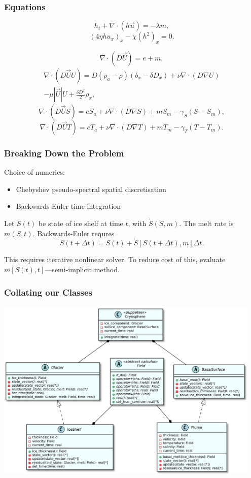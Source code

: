 \documentclass[12pt]{beamer}
\begin{document}
\begin{frame}
  \frametitle{Equations}
  $$ h_{t} + \nabla\cdot(h\vec{u}) = -\lambda m, $$
  $$ {\left(4\eta hu_x\right)}_{x} - \chi{\left(h^2\right)}_x = 0. $$
  
  $$ \nabla\cdot\left(D\vec{U}\right) = e + m, $$
  \begin{multline*}
    \nabla\cdot\left(D\vec{U}U\right) = D(\rho_a - \rho)\left(b_x -
      \delta D_x\right) + \nu\nabla\cdot\left(D\nabla U\right) \\
    - \mu|\vec{U}|U + \frac{\delta D^2}{2}\rho_x,
  \end{multline*}
  $$ \nabla\cdot\left(D\vec{U}S\right) = eS_a
  + \nu\nabla\cdot\left(D\nabla S\right) + mS_m - \gamma_S(S-S_m), $$
  $$ \nabla\cdot\left(D\vec{U}T\right) = eT_a
  + \nu\nabla\cdot\left(D\nabla T\right) + mT_m - \gamma_T(T-T_m). $$
\end{frame}

\begin{frame}
  \frametitle{Breaking Down the Problem}
  Choice of numerics:
  \begin{itemize}
  \item Chebyshev pseudo-spectral spatial discretisation
  \item Backwards-Euler time integration
  \end{itemize}
  
  \vspace{3mm}
  Let $S(t)$ be state of ice shelf at time $t$, with
  $\dot{S}(S,m)$. The melt rate is $m(S,t)$. Backwards-Euler requres
  $$ S(t+\Delta t) = S(t) + \dot{S}[S(t+\Delta t),m]\Delta t. $$
  
  This requires iterative nonlinear solver. To reduce cost of this,
  evaluate $m[S(t),t]$---semi-implicit method.
\end{frame}

\begin{frame}
  \frametitle{Collating our Classes}
  \begin{center}
    \includegraphics[width=0.95\textwidth]{isoft_classes.pdf}
  \end{center}
\end{frame}
\end{document}
